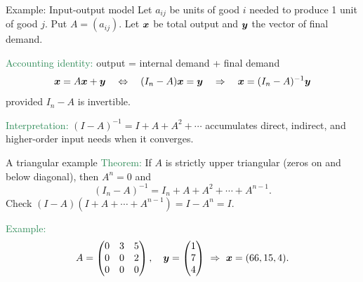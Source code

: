 \documentclass[11pt,aspectratio=169]{beamer}
\begin{document}

\begin{frame}{Example: Input-output model}
Let $a_{ij}$ be units of good $i$ needed to produce 1 unit of good $j$. Put $A=(a_{ij})$.
Let $\boldsymbol x$ be total output and $\boldsymbol y$ the vector of final demand.
\bigskip

\textcolor{SeaGreen}{Accounting identity:} output = internal demand + final demand
\[
\boldsymbol x = A\boldsymbol x + \boldsymbol y
\quad\Leftrightarrow\quad
(I_n-A)\boldsymbol x=\boldsymbol y
\quad\Rightarrow\quad
\boldsymbol x=(I_n-A)^{-1}\boldsymbol y
\]
provided $I_n-A$ is invertible.
\bigskip

\textcolor{SeaGreen}{Interpretation:} $(I-A)^{-1}=I+A+A^2+\cdots$ accumulates direct, indirect, and higher-order input needs when it converges.
\end{frame}

\begin{frame}{A triangular example}
\textcolor{SeaGreen}{Theorem:} If $A$ is strictly upper triangular (zeros on and below diagonal), then $A^n=0$ and
\[
(I_n-A)^{-1}=I_n+A+A^2+\cdots+A^{n-1}.
\]
{\tiny Check $(I-A)(I+A+\cdots+A^{n-1})=I-A^n=I$.}
\bigskip

\textcolor{SeaGreen}{Example:}
\[
A=\begin{pmatrix}
0&3&5\\
0&0&2\\
0&0&0
\end{pmatrix},\quad
\boldsymbol y=\begin{pmatrix}1\\ 7\\ 4\end{pmatrix}
\ \Rightarrow\
\boldsymbol x=(66,15,4).
\]
\end{frame}
\end{document}
